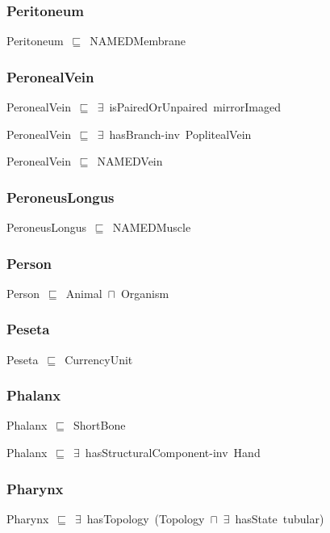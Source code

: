 \documentclass{article}
\begin{document}
\subsubsection*{Peritoneum}

Peritoneum~\ensuremath{\sqsubseteq}~NAMEDMembrane~

\subsubsection*{PeronealVein}

PeronealVein~\ensuremath{\sqsubseteq}~\ensuremath{\exists}~isPairedOrUnpaired~mirrorImaged~

PeronealVein~\ensuremath{\sqsubseteq}~\ensuremath{\exists}~hasBranch-inv~PoplitealVein~

PeronealVein~\ensuremath{\sqsubseteq}~NAMEDVein~

\subsubsection*{PeroneusLongus}

PeroneusLongus~\ensuremath{\sqsubseteq}~NAMEDMuscle~

\subsubsection*{Person}

Person~\ensuremath{\sqsubseteq}~Animal~\ensuremath{\sqcap}~Organism~

\subsubsection*{Peseta}

Peseta~\ensuremath{\sqsubseteq}~CurrencyUnit~

\subsubsection*{Phalanx}

Phalanx~\ensuremath{\sqsubseteq}~ShortBone~

Phalanx~\ensuremath{\sqsubseteq}~\ensuremath{\exists}~hasStructuralComponent-inv~Hand~

\subsubsection*{Pharynx}

Pharynx~\ensuremath{\sqsubseteq}~\ensuremath{\exists}~hasTopology~(Topology~\ensuremath{\sqcap}~\ensuremath{\exists}~hasState~tubular)~
\end{document}
